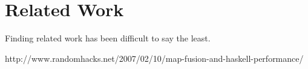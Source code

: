 \chapter{Related Work}

Finding related work has been difficult to say the least.  

http://www.randomhacks.net/2007/02/10/map-fusion-and-haskell-performance/